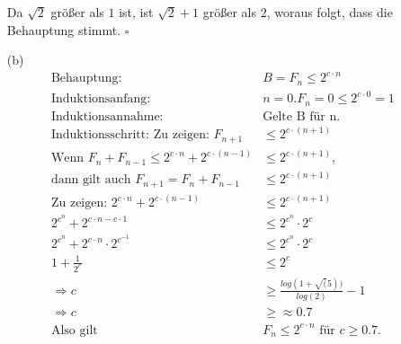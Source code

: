 \documentclass{article}
\begin{document}
\begin{enumerate}
Da $\sqrt{2}$ größer als $1$ ist, ist $\sqrt{2}+1$ größer als $2$, woraus folgt,
dass die Behauptung stimmt. \quad $\square$
\item[(b)]
\begin{align*}
\text{Behauptung: } &B = F_n \le 2^{c \cdot n} \\
\text{Induktionsanfang: } & n = 0. F_n = 0 \le 2^{c \cdot 0} = 1 \\
\text{Induktionsannahme: } &\text{Gelte B für n. } \\
\text{Induktionsschritt: Zu zeigen: } F_{n+1} &\le 2^{c \cdot (n+1)} \\
\text{Wenn } F_n + F_{n-1} \le 2^{c \cdot n} + 2^{c \cdot (n-1)} &\le 2^{c \cdot (n+1)}, \\
\text{dann gilt auch } F_{n+1} = F_n + F_{n-1} &\le 2^{c \cdot (n+1)} \\
\text{Zu zeigen: }  2^{c \cdot n} + 2^{c \cdot (n-1)} &\le 2^{c \cdot (n+1)} \\
2^{c^n} + 2^{c \cdot n - c \cdot 1} &\le 2^{c^n} \cdot 2^c \\
2^{c^n} + 2^{c \cdot n} \cdot 2^{c^{-1}} &\le 2^{c^n} \cdot 2^c \\
1 + \frac{1}{2^c} &\le 2^c \\
\Rightarrow c &\ge \frac{log(1+\sqrt(5))}{log(2)} -1 \\
\Rightarrow c &\ge \approx 0.7 \\
\text{Also gilt } &F_n \le 2^{c \cdot n} \text{ für } c \ge 0.7.
\end{align*}
\end{enumerate}
\end{document}
